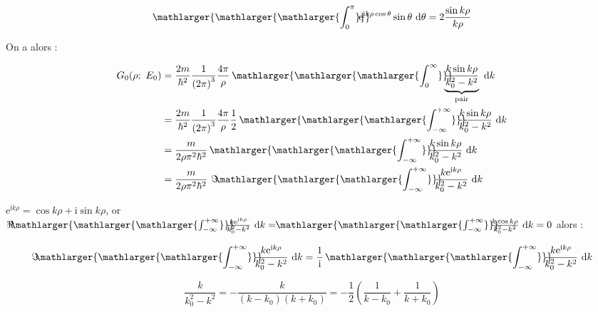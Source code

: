 \documentclass[12pt,a4paper,oneside,french]{book}
\renewcommand{\i}{\mathrm{i}}
\newcommand{\e}{\mathrm{e}}
\newcommand{\diff}{\mathrm{d}}
\newcommand{\Bigint}[2]{\mathop{\mathlarger{\mathlarger{\mathlarger{\int_{#1}^{#2}}}}}}
\newcommand{\removeintspace}{\!\!\!\!\!\!\!\!}
\theoremstyle{definition}
\theoremstyle{definition}
\theoremstyle{definition}
\theoremstyle{remark}
\theoremstyle{definition}
\begin{document}
    \begin{equation*}
        \Bigint{0}{\pi} \removeintspace {\e}^{\i k \rho \cos{\theta}} \sin{\theta} \ \diff \theta = 2 \frac{\sin{k \rho}}{k \rho}
    \end{equation*}
    
    On a alors :
    
    \begin{equation*}
    \begin{split}
        {G}_{0}(\rho; \ {E}_{0}) 
            &= \frac{2m}{{\hbar}^{2}} \frac{1}{{(2\pi)}^{3}} \frac{4\pi}{\rho} \Bigint{0}{\infty} \removeintspace \ \underbrace{\frac{k \sin{k \rho}}{{k}_{0}^{2} - {k}^{2}}}_{\text{pair}} \ \diff k \\
            &= \frac{2m}{{\hbar}^{2}} \frac{1}{{(2\pi)}^{3}} \frac{4\pi}{\rho} \frac{1}{2} \Bigint{-\infty}{+\infty} \removeintspace \ \frac{k \sin{k \rho}}{{k}_{0}^{2} - {k}^{2}} \ \diff k \\
            &= \frac{m}{2 \rho {\pi}^{2} {\hbar}^{2}} \Bigint{-\infty}{+\infty} \removeintspace \ \frac{k \sin{k \rho}}{{k}_{0}^{2} - {k}^{2}} \ \diff k \\
            &= \frac{m}{2 \rho {\pi}^{2} {\hbar}^{2}} \ \Im \!\!\! \Bigint{-\infty}{+\infty} \removeintspace \ \frac{k {\e}^{\i k \rho}}{{k}_{0}^{2} - {k}^{2}} \ \diff k
    \end{split}
    \end{equation*}
    
    ${\e}^{\i k \rho} = \cos{k \rho} + \i \sin{k \rho}$, or $\Re \!\!\! \Bigint{-\infty}{+\infty} \removeintspace \ \frac{k {\e}^{\i k \rho}}{{k}_{0}^{2} - {k}^{2}} \ \diff k = \!\! \Bigint{-\infty}{+\infty} \removeintspace \ \frac{k \cos{k \rho}}{{k}_{0}^{2} - {k}^{2}} \ \diff k = 0$ alors :
    
    \begin{equation*}
        \Im \!\!\! \Bigint{-\infty}{+\infty} \removeintspace \ \frac{k {\e}^{\i k \rho}}{{k}_{0}^{2} - {k}^{2}} \ \diff k = \frac{1}{\i} \Bigint{-\infty}{+\infty} \removeintspace \ \frac{k {\e}^{\i k \rho}}{{k}_{0}^{2} - {k}^{2}} \ \diff k
    \end{equation*}
    
    \begin{equation*}
        \frac{k}{{k}_{0}^{2} - {k}^{2}} = -\frac{k}{\left(k - {k}_{0}\right)\left(k + {k}_{0}\right)} = -\frac{1}{2} \left(\frac{1}{k - {k}_{0}} + \frac{1}{k + {k}_{0}}\right)
    \end{equation*}
    
\end{document}
